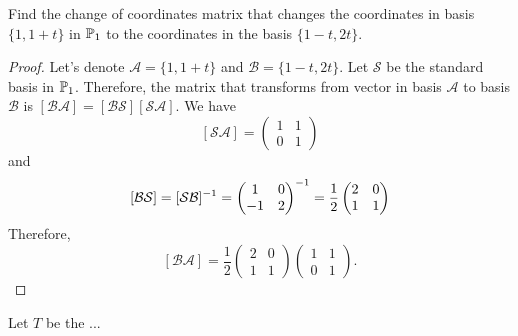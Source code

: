 \begin{exercise}
  Find the change of coordinates matrix that changes the 
  coordinates in basis $\{1,1+t\}$ in $\P_1$ to the 
  coordinates in the basis $\{1-t, 2t\}$.
\end{exercise}
\begin{proof}
  Let's denote $\mathcal{A}=\{1,1+t\}$ and 
  $\mathcal{B}=\{1-t, 2t\}$. Let $\mathcal{S}$
  be the standard basis in $\P_1$. Therefore, 
  the matrix that transforms from vector in basis
  $\mathcal{A}$ to basis $\mathcal{B}$ is 
  $[\mathcal{BA}]= [\mathcal{BS}][\mathcal{SA}]$.
  We have
  \[ [\mathcal{SA}] = \begin{pmatrix} 1 &1 \\ 0 &1 \end{pmatrix} \]
  and 
  \[
    [\mathcal{BS}]=[\mathcal{SB}]^{-1}=
    \begin{pmatrix} 1  & 0\\ -1 & 2 \end{pmatrix}^{-1}=\frac{1}{2}
    \begin{pmatrix} 2 &0\\ 1 &1 \end{pmatrix}
  \]
  Therefore, 
  \[
    [\mathcal{BA}]= \frac{1}{2}
    \begin{pmatrix} 2 &0\\ 1 &1 \end{pmatrix}
    \begin{pmatrix} 1 &1 \\ 0 &1 \end{pmatrix}.
  \]
\end{proof}
\begin{exercise}
  Let $T$ be the ...
\end{exercise}
